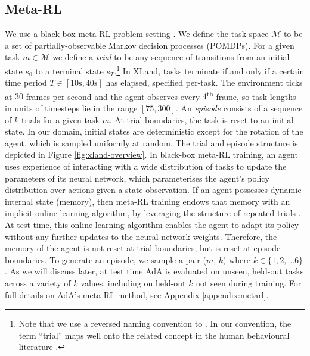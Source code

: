 \documentclass[11pt, a4paper, logo, copyright]{deepmind}
\begin{document}
\subsection{Meta-RL} \label{sec:methods_problem}
We use a black-box meta-RL problem setting \citep{duan2017rl, wang2016learning}. We define the task space $\mathcal{M}$ to be a set of partially-observable Markov decision processes (POMDPs). For a given task $m \in \mathcal{M}$ we define a \emph{trial} to be any sequence of transitions from an initial state $s_0$ to a terminal state $s_T$.\footnote{Note that we use a reversed naming convention to \citet{duan2017rl}. In our convention, the term ``trial'' maps well onto the related concept in the human behavioural literature \citep{barbosa2022practical}.} In XLand, tasks terminate if and only if a certain time period $T \in [10\textrm{s}, 40\textrm{s}]$ has elapsed, specified per-task. The environment ticks at $30$ frames-per-second and the agent observes every $4$\textsuperscript{th} frame, so task lengths in units of timesteps lie in the range $[75, 300]$.
An \emph{episode} consists of a sequence of $k$ trials for a given task $m$. At trial boundaries, the task is reset to an initial state. In our domain, initial states are deterministic except for the rotation of the agent, which is sampled uniformly at random. The trial and episode structure is depicted in Figure \ref{fig:xland-overview}.
In black-box meta-RL training, an agent uses experience of interacting with a wide distribution of tasks to update the parameters of its neural network, which parameterises the agent's policy distribution over actions given a state observation. If an agent possesses dynamic internal state (memory), then meta-RL training endows that memory with an implicit online learning algorithm, by leveraging the structure of repeated trials \citep{mikulik2020metatrained}.
At test time, this online learning algorithm enables the agent to adapt its policy without any further updates to the neural network weights. Therefore, the memory of the agent is not reset at trial boundaries, but is reset at episode boundaries. To generate an episode, we sample a pair ($m$, $k$) where $k \in \{1,2, \dots 6\}$. As we will discuss later, at test time AdA is evaluated on unseen, held-out tasks across a variety of $k$ values, including on held-out $k$ not seen during training. For full details on AdA's meta-RL method, see Appendix \ref{appendix:metarl}.
\end{document}
